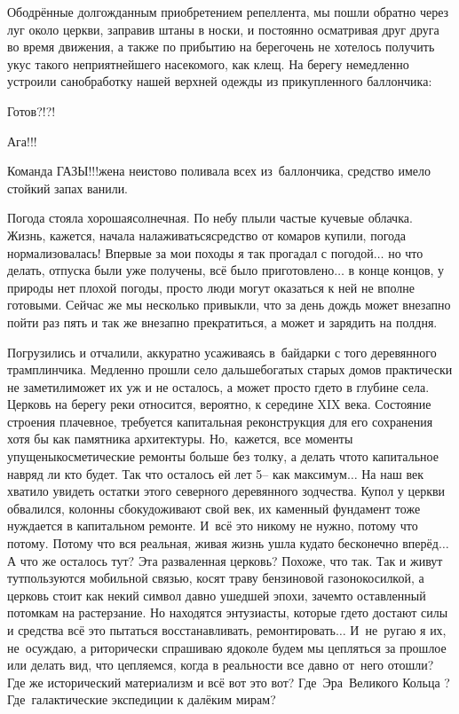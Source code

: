 Ободрённые долгожданным приобретением репеллента, мы пошли обратно через луг около церкви, заправив штаны в носки, и постоянно осматривая друг друга во время движения, а также по прибытию на берег\mdash очень не хотелось получить укус такого неприятнейшего насекомого, как клещ. На берегу немедленно устроили санобработку нашей верхней одежды из прикупленного баллончика:

\diagdash Готов?!?!

\diagdash Ага!!!

\diagdash Команда ГАЗЫ!!!\mdash жена неистово поливала всех из~баллончика, средство имело стойкий запах ванили.

Погода стояла хорошая\mdash солнечная. По небу плыли частые кучевые облачка. Жизнь, кажется, начала налаживаться\mdash средство от комаров купили, погода нормализовалась! Впервые за мои походы я так прогадал с погодой$\ldots$ но что делать, отпуска были уже получены, всё было приготовлено$\ldots$ в конце концов, у природы нет плохой погоды, просто люди могут оказаться к ней не вполне готовыми. Сейчас же мы несколько привыкли, что за день дождь может внезапно пойти раз пять и так же внезапно прекратиться, а может и зарядить на полдня. 

Погрузились и отчалили, аккуратно усаживаясь в~байдарки с того деревянного трамплинчика. Медленно прошли село дальше\mdash богатых старых домов практически не заметили\mdash может их уж и не осталось, а может просто где\sdash то в глубине села. Церковь на берегу реки относится, вероятно, к середине XIX века. Состояние строения плачевное, требуется капитальная реконструкция для его сохранения хотя бы как памятника архитектуры. Но,~кажется, все моменты упущены\mdash косметические ремонты больше без толку, а делать что\sdash то капитальное навряд ли кто будет. Так что осталось ей лет 5\thinspace\nobreakdash-- как максимум$\ldots$ На наш век хватило увидеть остатки этого северного деревянного зодчества. Купол у церкви обвалился, колонны сбоку\mdash доживают свой век, их каменный фундамент тоже нуждается в капитальном ремонте. И~всё это никому не нужно, потому что потому. Потому что вся реальная, живая жизнь ушла куда\sdash то бесконечно вперёд$\ldots$ А что же осталось тут? Эта разваленная церковь? Похоже, что так. Так и живут тут\mdash пользуются мобильной связью, косят траву бензиновой газонокосилкой, а церковь стоит как некий символ давно ушедшей эпохи, зачем\sdash то оставленный потомкам на растерзание. Но находятся энтузиасты, которые где\sdash то достают силы и средства всё это пытаться восстанавливать, ремонтировать$\ldots$ И~не~ругаю я их, не~осуждаю, а риторически спрашиваю я\mdash доколе будем мы цепляться за прошлое или делать вид, что цепляемся, когда в реальности все давно от~него отошли? Где же исторический материализм и всё вот это вот? Где~Эра~Великого Кольца \cite{ТуманностьАндромеды}? Где~галактические экспедиции к далёким мирам?

